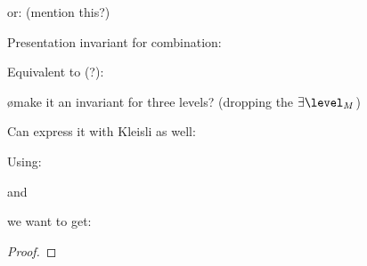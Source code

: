 or: (mention this?)

\xpr{
\present & \equ & \present\L \klei  \present\H\\
\interpret & \equ &\interpret\H \klei  \interpret\L
}


Presentation invariant for combination:


Equivalent to (?): 


\bl
\o make it an invariant for three levels? (dropping the $\exists \level_M$)
\el

Can express it with Kleisli as well:





Using:


and



we want to get:



\begin{proof}
\end{proof}

